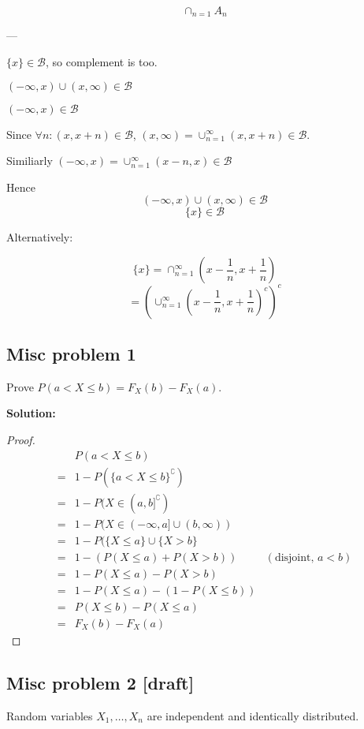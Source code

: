 \documentclass{article}
\begin{document}
\[\cap_{n=1} A_n \]

---

\(\{x\} \in \mathcal{B}\), so complement is too.

\((-\infty,x)\cup (x,\infty)\in \mathcal{B}\)

\((-\infty,x)\in \mathcal{B}\)

Since \(\forall n: (x,x+n)\in \mathcal{B}\),
\((x,\infty)=\cup_{n=1}^\infty(x,x+n)\in \mathcal{B}\).

Similiarly
\((-\infty,x)=\cup_{n=1}^\infty (x-n,x)\in\mathcal{B}\)

Hence
\[(-\infty,x)\cup (x,\infty)\in \mathcal{B}\]
\[\{x\}\in \mathcal{B}\]

Alternatively:

\[\{x\} = \cap_{n=1}^{\infty} (x-\frac{1}{n}, x+\frac{1}{n})\]
\[= (\cup_{n=1}^{\infty} (x-\frac{1}{n}, x+\frac{1}{n})^c)^c\]

\subsection{Misc problem 1}

Prove \(P(a < X \leq b) = F_X(b)-F_X(a)\).

\textbf{Solution:}

\begin{proof}
\begin{align*}
     & P(a<X\leq b) \\
    =& 1-P(\{a<X\leq b\}^\complement) \\
    =& 1-P(X\in (a,b]^\complement) \\
    =& 1-P(X\in (-\infty,a] \cup (b,\infty)) \\
    =& 1-P(\{X\leq a\} \cup \{X>b\} \\
    =& 1-(P(X\leq a)+P(X>b)) & (\text{disjoint, }a<b) \\
    =& 1-P(X\leq a)-P(X>b) \\
    =& 1-P(X\leq a)-(1-P(X\leq b)) \\
    =& P(X\leq b)-P(X\leq a) \\
    =& F_X(b)-F_X(a)
\end{align*}
\end{proof}

\subsection{Misc problem 2 [draft]}

Random variables \(X_1,\ldots,X_n\) are independent and identically distributed.
\end{document}
